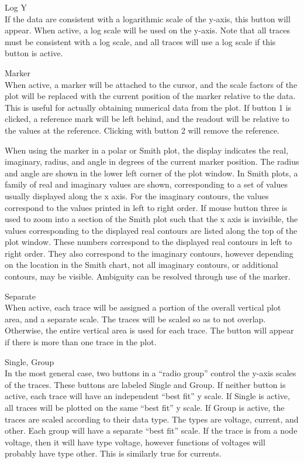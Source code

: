 \begin{description}
\item{\cb Log Y}\\
If the data are consistent with a logarithmic scale of the y-axis,
this button will appear.  When active, a log scale will be used on the
y-axis.  Note that all traces must be consistent with a log scale, and
all traces will use a log scale if this button is active.

\item{\cb Marker}\\
When active, a marker will be attached to the cursor, and the scale
factors of the plot will be replaced with the current position of the
marker relative to the data.  This is useful for actually obtaining
numerical data from the plot.  If button 1 is clicked, a reference
mark will be left behind, and the readout will be relative to the
values at the reference.  Clicking with button 2 will remove the
reference.

When using the marker in a polar or Smith plot, the display indicates
the real, imaginary, radius, and angle in degrees of the current
marker position.  The radius and angle are shown in the lower left
corner of the plot window.  In Smith plots, a family of real and
imaginary values are shown, corresponding to a set of values usually
displayed along the x axis.  For the imaginary contours, the values
correspond to the values printed in left to right order.  If mouse
button three is used to zoom into a section of the Smith plot such
that the x axis is invisible, the values corresponding to the
displayed real contours are listed along the top of the plot window. 
These numbers correspond to the displayed real contours in left to
right order.  They also correspond to the imaginary contours, however
depending on the location in the Smith chart, not all imaginary
contours, or additional contours, may be visible.  Ambiguity can be
resolved through use of the marker.

\item{\cb Separate}\\
When active, each trace will be assigned a portion of the overall
vertical plot area, and a separate scale.  The traces will be scaled
so as to not overlap.  Otherwise, the entire vertical area is used for
each trace.  The button will appear if there is more than one trace in
the plot.

\item{\cb Single}, {\cb Group}\\
In the most general case, two buttons in a ``radio group'' control the
y-axis scales of the traces.  These buttons are labeled {\cb Single}
and {\cb Group}.  If neither button is active, each trace will have an
independent ``best fit'' y scale.  If {\cb Single} is active, all
traces will be plotted on the same ``best fit'' y scale.  If {\cb
Group} is active, the traces are scaled according to their data type. 
The types are voltage, current, and other.  Each group will have a
separate ``best fit'' scale.  If the trace is from a node voltage,
then it will have type voltage, however functions of voltages will
probably have type other.  This is similarly true for currents.


\end{description}

